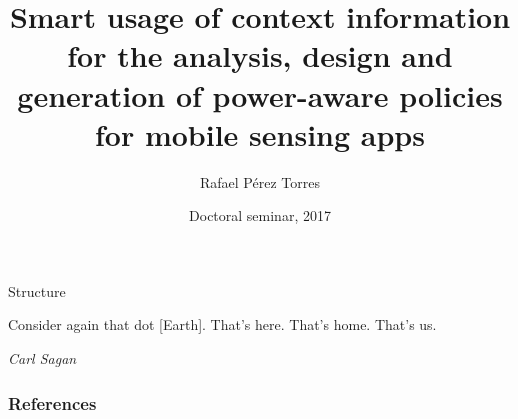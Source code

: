 \documentclass[8pt,xcolor={dvipsnames,table,xcdraw},handout]{beamer} %
\title[Smart usage of context information for the analysis, design and generation of power-aware policies for MSAs]{Smart usage of context information for the analysis, design and generation of power-aware policies for mobile sensing apps}
\author[Cinvestav-Tamaulipas]{Rafael Pérez Torres}
\institute[
  ITL Information Technology Laboratory\\
  Cinvestav\\
  Tamaulipas
] 
{Dr. César Torres Huitzil\\Dr. Hiram Galeana Zapién\\Cinvestav}
\date{Doctoral seminar, 2017}
\begin{document}
{\aauwavesbg%
\begin{frame} %
  \titlepage
\end{frame}}

\begin{frame}{Structure}{}
  \tableofcontents[hideallsubsections]
\end{frame}











{\aauwavesbg
\begin{frame}
  { \tiny
    \epigraph{\tiny Consider again that dot [Earth]. That's here. That's home. That's us.}{\tiny \textit{Carl Sagan}}
  }
\end{frame}}



\begin{frame}
        \frametitle{References}
%
{
\tiny{}


}
\end{frame}
\end{document}
